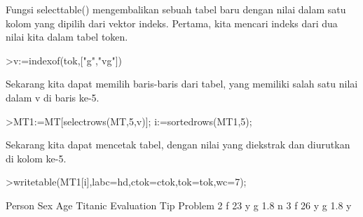 \documentclass[a4paper,10pt]{article}
\begin{document}
\begin{eulernotebook}
\begin{eulercomment}
\begin{eulercomment}
\begin{eulercomment}
\begin{eulercomment}
\begin{eulercomment}
\begin{eulercomment}
\begin{eulercomment}
\begin{eulercomment}
\begin{eulercomment}
\begin{eulercomment}
\begin{eulercomment}
\begin{eulercomment}
\begin{eulercomment}
\begin{eulercomment}
\begin{eulercomment}
\begin{eulercomment}
\begin{eulercomment}
\begin{eulercomment}
\begin{eulercomment}
\begin{eulercomment}
\begin{eulercomment}
\begin{eulercomment}
\begin{eulercomment}
\begin{eulercomment}
\begin{eulercomment}
\begin{eulercomment}
\begin{eulercomment}
\begin{eulercomment}
\begin{eulercomment}
\begin{eulercomment}
\begin{eulercomment}
\begin{eulercomment}
\begin{eulercomment}
\begin{eulercomment}
\begin{eulercomment}
\begin{eulercomment}
\begin{eulercomment}
\begin{eulercomment}
\begin{eulercomment}
\begin{eulercomment}
\begin{eulercomment}
\begin{eulercomment}
\begin{eulercomment}
\begin{eulercomment}
\begin{eulercomment}
Fungsi selecttable() mengembalikan sebuah tabel baru dengan nilai
dalam satu kolom yang dipilih dari vektor indeks. Pertama, kita
mencari indeks dari dua nilai kita dalam tabel token.
\end{eulercomment}
\begin{eulerprompt}
>v:=indexof(tok,["g","vg"])
\end{eulerprompt}
\begin{euleroutput}
  [5,  6]
\end{euleroutput}
\begin{eulercomment}
Sekarang kita dapat memilih baris-baris dari tabel, yang memiliki
salah satu nilai dalam v di baris ke-5.
\end{eulercomment}
\begin{eulerprompt}
>MT1:=MT[selectrows(MT,5,v)]; i:=sortedrows(MT1,5);
\end{eulerprompt}
\begin{eulercomment}
Sekarang kita dapat mencetak tabel, dengan nilai yang diekstrak dan
diurutkan di kolom ke-5.
\end{eulercomment}
\begin{eulerprompt}
>writetable(MT1[i],labc=hd,ctok=ctok,tok=tok,wc=7);
\end{eulerprompt}
\begin{euleroutput}
   Person    Sex    Age Titanic Evaluation    Tip Problem
        2      f     23       y          g    1.8       n
        3      f     26       y          g    1.8       y

\end{euleroutput}
\end{eulercomment}
\end{eulercomment}
\end{eulercomment}
\end{eulercomment}
\end{eulercomment}
\end{eulercomment}
\end{eulercomment}
\end{eulercomment}
\end{eulercomment}
\end{eulercomment}
\end{eulercomment}
\end{eulercomment}
\end{eulercomment}
\end{eulercomment}
\end{eulercomment}
\end{eulercomment}
\end{eulercomment}
\end{eulercomment}
\end{eulercomment}
\end{eulercomment}
\end{eulercomment}
\end{eulercomment}
\end{eulercomment}
\end{eulercomment}
\end{eulercomment}
\end{eulercomment}
\end{eulercomment}
\end{eulercomment}
\end{eulercomment}
\end{eulercomment}
\end{eulercomment}
\end{eulercomment}
\end{eulercomment}
\end{eulercomment}
\end{eulercomment}
\end{eulercomment}
\end{eulercomment}
\end{eulercomment}
\end{eulercomment}
\end{eulercomment}
\end{eulercomment}
\end{eulercomment}
\end{eulercomment}
\end{eulercomment}
\end{eulernotebook}
\end{document}
